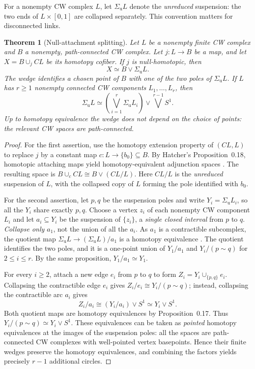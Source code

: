 \documentclass[11pt,letterpaper]{article}
\newtheorem{theorem}{Theorem}[section]
\theoremstyle{definition}
\theoremstyle{remark}
\newcommand{\SigmaU}{\Sigma_{\mathrm u}}
\begin{document}
For a nonempty CW complex \(L\), let \(\SigmaU L\) denote the \emph{unreduced} suspension: the two ends of \(L\times[0,1]\) are collapsed separately. This convention matters for disconnected links.

\begin{theorem}[Null-attachment splitting]\label{thm:split}
Let \(L\) be a nonempty finite CW complex and \(B\) a nonempty,
\emph{path-connected} CW complex. Let \(j:L\to B\) be a map,
and let \(X=B\cup_j CL\) be its homotopy cofiber. If \(j\) is
null-homotopic, then
\[
 \boxed{X\simeq B\vee\SigmaU L.}
\]
The wedge identifies a chosen point of \(B\) with \emph{one of the two poles}
of \(\SigmaU L\). If \(L\) has \(r\ge1\) nonempty connected
CW components \(L_1,\ldots,L_r\), then
\[
 \boxed{\SigmaU L\simeq
 \left(\bigvee_{i=1}^r\SigmaU L_i\right)\vee
 \bigvee^{r-1}S^1.}
\]
Up to homotopy equivalence the wedge does not depend on the choice of
points: the relevant CW spaces are path-connected.
\end{theorem}
\begin{proof}
For the first assertion, use the homotopy extension property of
\((CL,L)\) to replace \(j\) by a constant map
\(c:L\to\{b_0\}\subseteq B\). By Hatcher's
Proposition~0.18, homotopic attaching maps yield homotopy-equivalent
adjunction spaces \cite[Prop.~0.18]{Hatcher2002}. The resulting
space is \(B\cup_c CL\cong B\vee (CL/L)\). Here \(CL/L\) is the
\emph{unreduced} suspension of \(L\), with the collapsed copy of
\(L\) forming the pole identified with \(b_0\).

For the second assertion, let \(p,q\) be the suspension poles and
write \(Y_i=\SigmaU L_i\), so all the \(Y_i\) share exactly
\(p,q\). Choose a vertex \(z_i\) of each nonempty CW component
\(L_i\) and let \(a_i\subseteq Y_i\) be the suspension of
\(\{z_i\}\), a \emph{single closed interval} from \(p\) to \(q\).
\emph{Collapse only \(a_1\)}, not the union of all the \(a_i\).
As \(a_1\) is a contractible subcomplex, the quotient map
\(\SigmaU L\to (\SigmaU L)/a_1\) is a homotopy equivalence
\cite[Prop.~0.17]{Hatcher2002}. The quotient identifies the two
poles, and it is a one-point union of \(Y_1/a_1\) and
\(Y_i/(p\sim q)\) for \(2\le i\le r\). By the same proposition,
\(Y_1/a_1\simeq Y_1\).

For every \(i\ge2\), attach a new edge \(e_i\) from \(p\) to \(q\)
to form \(Z_i=Y_i\cup_{\{p,q\}}e_i\). Collapsing the contractible
edge \(e_i\) gives \(Z_i/e_i\cong Y_i/(p\sim q)\); instead,
collapsing the contractible arc \(a_i\) gives
\[
 Z_i/a_i\cong (Y_i/a_i)\vee S^1\simeq Y_i\vee S^1.
\]
Both quotient maps are homotopy equivalences by Proposition~0.17.
Thus \(Y_i/(p\sim q)\simeq Y_i\vee S^1\). These equivalences
can be taken as \emph{pointed} homotopy equivalences at the images
of the suspension poles: all the spaces are path-connected CW
complexes with well-pointed vertex basepoints. Hence their finite
wedges preserve the homotopy equivalences, and combining the factors
yields precisely \(r-1\) additional circles.
\end{proof}
\end{document}
